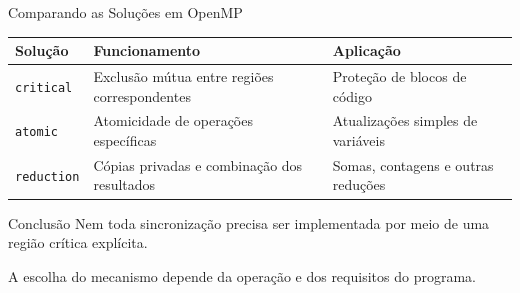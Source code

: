 \documentclass[aspectratio=169,11pt]{beamer}
\begin{document}

\begin{frame}{Comparando as Soluções em OpenMP}

\small
\begin{center}
\begin{tabular}{p{2.0cm}|p{3.3cm}|p{4.0cm}}
\hline
\textbf{Solução} &
\textbf{Funcionamento} &
\textbf{Aplicação} \\
\hline
\texttt{critical} &
Exclusão mútua entre regiões correspondentes &
Proteção de blocos de código \\
\hline
\texttt{atomic} &
Atomicidade de operações específicas &
Atualizações simples de variáveis \\
\hline
\texttt{reduction} &
Cópias privadas e combinação dos resultados &
Somas, contagens e outras reduções \\
\hline
\end{tabular}
\end{center}

\vspace{0.4cm}

\begin{block}{Conclusão}
Nem toda sincronização precisa ser implementada
por meio de uma região crítica explícita.

A escolha do mecanismo depende da operação
e dos requisitos do programa.
\end{block}

\end{frame}
\end{document}
